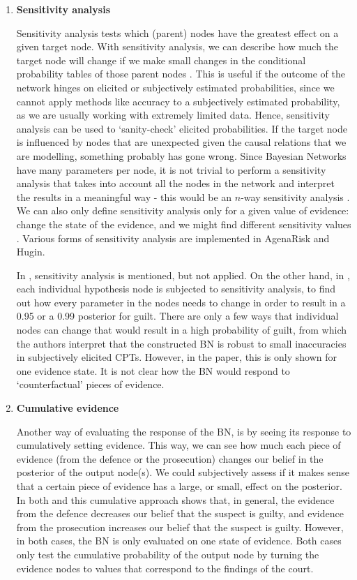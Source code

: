 \documentclass[12pt]{article}
\begin{document}
\begin{enumerate}

\item \textbf{Sensitivity analysis}

Sensitivity analysis tests which (parent) nodes have the greatest effect on a given target node. With sensitivity analysis, we can describe how much the target node will change if we make small changes in the conditional probability tables of those parent nodes \citep{fentonNeil2013}. This is useful if the outcome of the network hinges on elicited or subjectively estimated probabilities, since we cannot apply methods like accuracy to a subjectively estimated probability, as we are usually working with extremely limited data. Hence, sensitivity analysis can be used to `sanity-check' elicited probabilities. If the target node is influenced by nodes that are unexpected given the causal relations that we are modelling, something probably has gone wrong. Since Bayesian Networks have many parameters per node, it is not trivial to perform a sensitivity analysis that takes into account all the nodes in the network and interpret the results in a meaningful way - this would be an $n$-way sensitivity analysis \citep{gaag2007}. We can also only define sensitivity analysis only for a given value of evidence: change the state of the evidence, and we might find different sensitivity values \citep{fentonNeil2013}. Various forms of sensitivity analysis are implemented in AgenaRisk and Hugin.

In \citet{vlek2016}, sensitivity analysis is mentioned, but not applied. On the other hand, in \citet{Fenton2019}, each individual hypothesis node is subjected to sensitivity analysis, to find out how every parameter in the nodes needs to change in order to result in a 0.95 or a 0.99 posterior for guilt. There are only a few ways that individual nodes can change that would result in a high probability of guilt, from which the authors interpret that the constructed BN is robust to small inaccuracies in subjectively elicited CPTs. However, in the paper, this is only shown for one evidence state. It is not clear how the BN would respond to `counterfactual' pieces of evidence.


\item \textbf{Cumulative evidence}

Another way of evaluating the response of the BN, is by seeing its response to cumulatively setting evidence. This way, we can see how much each piece of evidence (from the defence or the prosecution) changes our belief in the posterior of the output node(s). We could subjectively assess if it makes sense that a certain piece of evidence has a large, or small, effect on the posterior. In both \citep{Fenton2019} and \citep{vlek2016} this cumulative approach shows that, in general, the evidence from the defence decreases our belief that the suspect is guilty, and evidence from the prosecution increases our belief that the suspect is guilty. However, in both cases, the BN is only evaluated on one state of evidence. Both cases only test the cumulative probability of the output node by turning the evidence nodes to values that correspond to the findings of the court. 


\end{enumerate}
\end{document}
